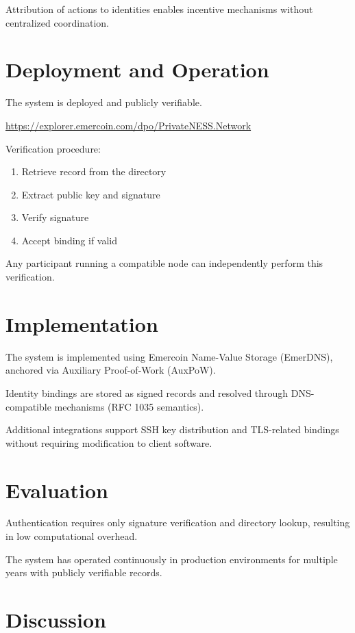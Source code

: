 \documentclass[11pt,a4paper]{article}
\begin{document}
Attribution of actions to identities enables incentive mechanisms without centralized coordination.

\section{Deployment and Operation}

The system is deployed and publicly verifiable.

\begin{center}
\url{https://explorer.emercoin.com/dpo/PrivateNESS.Network}
\end{center}

Verification procedure:

\begin{enumerate}
\item Retrieve record from the directory
\item Extract public key and signature
\item Verify signature
\item Accept binding if valid
\end{enumerate}

Any participant running a compatible node can independently perform this verification.

\section{Implementation}

The system is implemented using Emercoin Name-Value Storage (EmerDNS), anchored via Auxiliary Proof-of-Work (AuxPoW).

Identity bindings are stored as signed records and resolved through DNS-compatible mechanisms (RFC 1035 semantics).

Additional integrations support SSH key distribution and TLS-related bindings without requiring modification to client software.

\section{Evaluation}

Authentication requires only signature verification and directory lookup, resulting in low computational overhead.

The system has operated continuously in production environments for multiple years with publicly verifiable records.

\section{Discussion}
\end{document}
